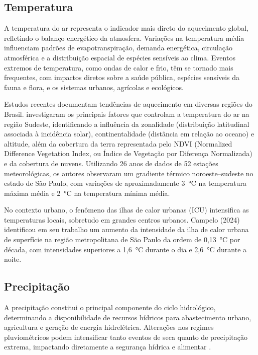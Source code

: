 \subsection{Temperatura}

A temperatura do ar representa o indicador mais direto do aquecimento global, refletindo o balanço energético da atmosfera. Variações na temperatura média influenciam padrões de evapotranspiração, demanda energética, circulação atmosférica e a distribuição espacial de espécies sensíveis ao clima. Eventos extremos de temperatura, como ondas de calor e frio, têm se tornado mais frequentes, com impactos diretos sobre a saúde pública, espécies sensíveis da fauna e flora, e os sistemas urbanos, agrícolas e ecológicos.

Estudos recentes documentam tendências de aquecimento em diversas regiões do Brasil. \cite{abreu2019} investigaram os principais fatores que controlam a temperatura do ar na região Sudeste, identificando a influência da zonalidade (distribuição latitudinal associada à incidência solar), continentalidade (distância em relação ao oceano) e altitude, além da cobertura da terra representada pelo NDVI (Normalized Difference Vegetation Index, ou Índice de Vegetação por Diferença Normalizada) e da cobertura de nuvens. Utilizando 26 anos de dados de 52 estações meteorológicas, os autores observaram um gradiente térmico noroeste--sudeste no estado de São Paulo, com variações de aproximadamente 3~°C na temperatura máxima média e 2~°C na temperatura mínima média.

No contexto urbano, o fenômeno das ilhas de calor urbanas (ICU) intensifica as temperaturas locais, sobretudo em grandes centros urbanos. Campelo (2024) identificou em seu trabalho um aumento da intensidade da ilha de calor urbana de superfície na região metropolitana de São Paulo da ordem de 0,13~°C por década, com intensidades superiores a 1,6~°C durante o dia e 2,6~°C durante a noite.

\subsection{Precipitação}

A precipitação constitui o principal componente do ciclo hidrológico, determinando a disponibilidade de recursos hídricos para abastecimento urbano, agricultura e geração de energia hidrelétrica. Alterações nos regimes pluviométricos podem intensificar tanto eventos de seca quanto de precipitação extrema, impactando diretamente a segurança hídrica e alimentar \citep{funk2015}.

